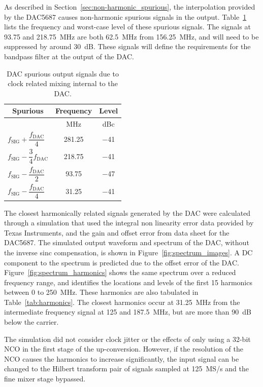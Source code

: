 \documentclass[12pt,letterpaper]{article}
\begin{document}
As described in Section~\ref{sec:non-harmonic_spurious}, the
interpolation provided by the DAC5687 causes non-harmonic spurious
signals in the output. Table~\ref{tab:spurious} lists the frequency
and worst-case level of these spurious signals. The signals at 93.75
and 218.75~MHz are both 62.5~MHz from 156.25~MHz, and will need to be
suppressed by around 30~dB. These signals will define the requirements
for the bandpass filter at the output of the DAC.

\begin{table}[htbp]
  \centering
  \caption{DAC spurious output signals due to clock related mixing
    internal to the DAC.}
  \label{tab:spurious}
  \vspace{0.5em}
  \begin{tabular}{|l|c|c|}
    \hline
    \multicolumn{1}{|c|}{\textbf{Spurious}} & \textbf{Frequency} & \textbf{Level} \\
    \hline
    & \multicolumn{1}{c|}{MHz} & \multicolumn{1}{c|}{dBc} \\
    \hline
    $f_\text{SIG}+\dfrac{f_\text{DAC}}{4}$  & 281.25 & $-$41 \\
    \hline
    $f_\text{SIG}-\dfrac{3}{4}f_\text{DAC}$ & 218.75 & $-$41 \\
    \hline
    $f_\text{SIG}-\dfrac{f_\text{DAC}}{2}$ & 93.75 & $-$47 \\
    \hline
    $f_\text{SIG}-\dfrac{f_\text{DAC}}{4}$ & 31.25 & $-$41 \\
    \hline
  \end{tabular}
\end{table}

The closest harmonically related signals generated by the DAC were
calculated through a simulation that used the integral non linearity
error data provided by Texas Instruments, and the gain and offset
error from data sheet for the DAC5687. The simulated output waveform
and spectrum of the DAC, without the inverse sinc compensation, is
shown in Figure~\ref{fig:spectrum_images}. A DC component to the
spectrum is predicted due to the offset error of the
DAC. Figure~\ref{fig:spectrum_harmonics} shows the same spectrum over
a reduced frequency range, and identifies the locations and levels of
the first 15 harmonics between 0 to 250~MHz. These harmonics are also
tabulated in Table~\ref{tab:harmonics}. The closest harmonics occur at
31.25~MHz from the intermediate frequency signal at 125 and 187.5~MHz,
but are more than 90~dB below the carrier.

The simulation did not consider clock jitter or the effects of only
using a 32-bit NCO in the first stage of the up-conversion. However,
if the resolution of the NCO causes the harmonics to increase
significantly, the input signal can be changed to the Hilbert
transform pair of signals sampled at 125~MS/s and the fine mixer stage
bypassed.
\end{document}
